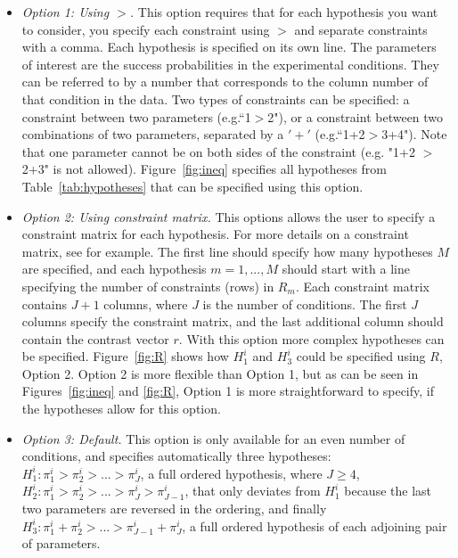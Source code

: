 \documentclass[11pt, fullpage, a4paper]{article}
\begin{document}
	\begin{itemize}
		\item \textit{Option 1: Using $>$. } This option requires that for each hypothesis you want to consider, you specify each constraint using $>$ and separate constraints with a comma.
		Each hypothesis is specified on its own line.
		The parameters of interest are the success probabilities in the experimental conditions.
		They can be referred to by a number that corresponds to the column number of that condition in the data.
		Two types of constraints can be specified: a constraint between two parameters (e.g.``1$>$2"), or a constraint between two combinations of two parameters, separated by a $'+'$ (e.g.``1+2$>$3+4"). 
		Note that one parameter cannot be on both sides of the constraint (e.g. "1+2 $>$ 2+3" is not allowed).
		Figure~\ref{fig:ineq} specifies all hypotheses from Table~\ref{tab:hypotheses} that can be specified using this option.
		\item \textit{Option 2: Using constraint matrix.} This options allows the user to specify a constraint matrix for each hypothesis.
		For more details on a constraint matrix, see \citeauthor{mulder12} \citeyear{mulder12} for example. 
		The first line should specify how many hypotheses $M$ are specified, and each hypothesis $m = 1,...,M$ should start with a line specifying the number of constraints (rows) in $R_{m}$.
		Each constraint matrix contains $J+1$ columns, where $J$ is the number of conditions. 
		The first $J$ columns specify the constraint matrix, and the last additional column should contain the contrast vector $r$.
		With this option more complex hypotheses can be specified.
		Figure~\ref{fig:R} shows how $H_{1}^{i}$ and $H_{3}^{i}$ could be specified using $R$, Option 2. 
		Option 2 is more flexible than Option 1, but as can be seen in Figures~\ref{fig:ineq} and \ref{fig:R}, Option 1 is more straightforward to specify, if the hypotheses allow for this option.
		\item \textit{Option 3: Default.} This option is only available for an even number of conditions, and specifies automatically three hypotheses: $H_{1}^{i}: \pi_{1}^{i} > \pi_{2}^{i} > ... > \pi_{J}^{i}$, a full ordered hypothesis, where $J\geq4$, $H_{2}^{i}: \pi_{1}^{i} > \pi_{2}^{i} > ... > \pi_{J}^{i}> \pi_{J-1}^{i}$, that only deviates from $H_{1}^{i}$ because the last two parameters are reversed in the ordering, and finally $H_{3}^{i}:\pi_{1}^{i}+ \pi_{2}^{i} > ... > \pi_{J-1}^{i} +\pi_{J}^{i}$, a full ordered hypothesis of each adjoining pair of parameters.
	\end{itemize}
	
\end{document}
